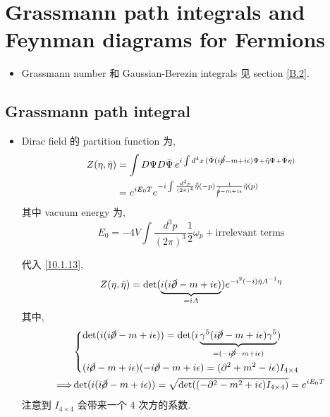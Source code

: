 \chapter{Grassmann path integrals and Feynman diagrams for Fermions}
\begin{itemize}
	\item Grassmann number 和 Gaussian-Berezin integrals 见 section \ref{B.2}.
\end{itemize}

\section{Grassmann path integral}
\begin{itemize}
	\item Dirac field 的 partition function 为,
	\begin{align}
		Z(\eta, \bar{\eta}) &= \int D\Psi D\bar{\Psi} \, e^{i \int d^4 x \, (\bar{\Psi} (i \cancel{\partial} - m + i \epsilon) \Psi + \bar{\eta} \Psi + \bar{\Psi} \eta)} \notag \\
		&= e^{i E_0 T} e^{- i \int \frac{d^4 p}{(2 \pi)^4} \tilde{\bar{\eta}}(- p) \frac{1}{\cancel{p} - m + i \epsilon} \tilde{\eta}(p)}
	\end{align}
	其中 vacuum energy 为,
	\begin{equation}
		E_0 = - 4 V \int \frac{d^3 p}{(2 \pi)^3} \frac{1}{2} \omega_p + \text{irrelevant terms}
	\end{equation}
	
	\begin{tcolorbox}[title=calculation:]
		代入 \eqref{10.1.13},
		\begin{equation}
			Z(\eta, \bar{\eta}) = \det(\underbrace{i (i \cancel{\partial} - m + i \epsilon)}_{= i A}) e^{- i^2 (- i) \bar{\eta} A^{- 1} \eta}
		\end{equation}
		其中,
		\begin{align}
			& \begin{dcases}
				\det(i (i \cancel{\partial} - m + i \epsilon)) = \det(i \underbrace{\gamma^5 (i \cancel{\partial} - m + i \epsilon) \gamma^5}_{= (- i \cancel{\partial} - m + i \epsilon)}) \\
				(i \cancel{\partial} - m + i \epsilon) (- i \cancel{\partial} - m + i \epsilon) = (\partial^2 + m^2 - i \epsilon) I_{4 \times 4}
			\end{dcases} \notag \\
			\Longrightarrow & \det(i (i \cancel{\partial} - m + i \epsilon)) = \sqrt{\det((- \partial^2 - m^2 + i \epsilon) I_{4 \times 4})} = e^{i E_0 T}
		\end{align}
		注意到 $I_{4 \times 4}$ 会带来一个 $4$ 次方的系数.
		

\end{tcolorbox}
\end{itemize}
